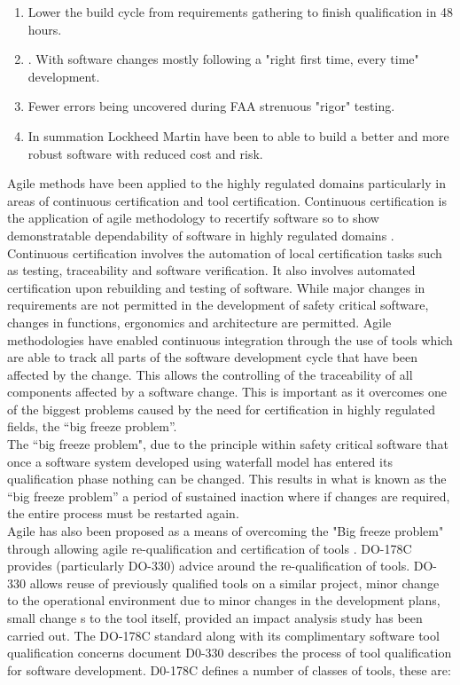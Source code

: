 \documentclass[11pt,twocolumn]{article}
\begin{document}
\begin{enumerate}
\item Lower the build cycle from requirements gathering to finish qualification in 48 hours.
\item. With software changes mostly following a "right first time, every time" development.
\item Fewer errors being uncovered during FAA strenuous "rigor" testing.
\item In summation Lockheed Martin have been to able to build a better and more robust software with reduced cost and risk.
\end{enumerate}
Agile methods have been applied to the highly regulated domains particularly in areas of continuous certification and tool certification. Continuous certification is the application of agile methodology to recertify software so to show demonstratable dependability of software in highly regulated domains \citep{Bordin:2011:Online}. Continuous certification involves the automation of local certification tasks such as testing, traceability and software verification. It also involves automated certification upon rebuilding and testing of software. While major changes in requirements are not permitted in the development of safety critical software, changes in functions, ergonomics and architecture are permitted. Agile methodologies have enabled continuous integration through the use of tools which are able to track all parts of the software development cycle that have been affected by the change. This allows the controlling of the traceability of all components affected by a software change. This is important as it overcomes one of the biggest problems caused by the need for certification in highly regulated fields, the “big freeze problem”. 
\\
The “big freeze problem", due to the principle within safety critical software that once a software system developed using waterfall model has entered its qualification phase nothing can be changed. This results in what is known as the “big freeze problem”  a period of sustained inaction where if changes are required, the entire process must be restarted again.
\\ 
Agile has also been proposed as a means of overcoming the "Big freeze problem" through allowing agile re-qualification and certification of tools \citep{Brogsol:2012:Online}. DO-178C provides (particularly DO-330) \citep{rierson2013developing} advice around the re-qualification of tools. DO-330 \citep{safety.do330} allows reuse of previously qualified tools on a similar project, minor change to the operational environment due to minor changes in the development plans, small change s to the tool itself, provided an impact analysis study has been carried out.  The DO-178C \citep{safety.do178c} standard along with its complimentary software tool qualification concerns document D0-330 describes the process of tool qualification for software development.  D0-178C defines a number of classes of tools, these are:
\end{document}
